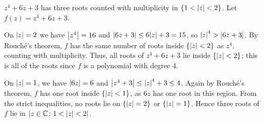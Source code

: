 \begin{example}
	\( z^4 + 6z + 3 \) has three roots counted with multiplicity in \( \qty{1 < \abs{z} < 2} \).
	Let \( f(z) = z^4 + 6z + 3 \).

	On \( \abs{z} = 2 \) we have \( \abs{z^4} = 16 \) and \( \abs{6z+3} \leq 6\abs{z} + 3 = 15 \), so \( \abs{z}^4 > \abs{6z+3} \).
	By Rouch\'e's theorem, \( f \) has the same number of roots inside \( \qty{\abs{z} < 2} \) as \( z^4 \), counting with multiplicity.
	Thus, all roots of \( z^4 + 6z + 3 \) lie inside \( \qty{\abs{z}<2} \); this is all of the roots since \( f \) is a polynomial with degree 4.

	On \( \abs{z} = 1 \), we have \( \abs{6z} = 6 \) and \( \abs{z^4 + 3} \leq \abs{z}^4 + 3 \leq 4 \).
	Again by Rouch\'e's theorem, \( f \) has one root inside \( \qty{\abs{z} < 1} \), as \( 6z \) has one root in this region.
	From the strict inequalities, no roots lie on \( \qty{\abs{z} = 2} \) or \( \qty{\abs{z} = 1} \).
	Hence three roots of \( f \) lie in \( \abs{z \in \mathbb C \colon 1 < \abs{z} < 2} \).
\end{example}
